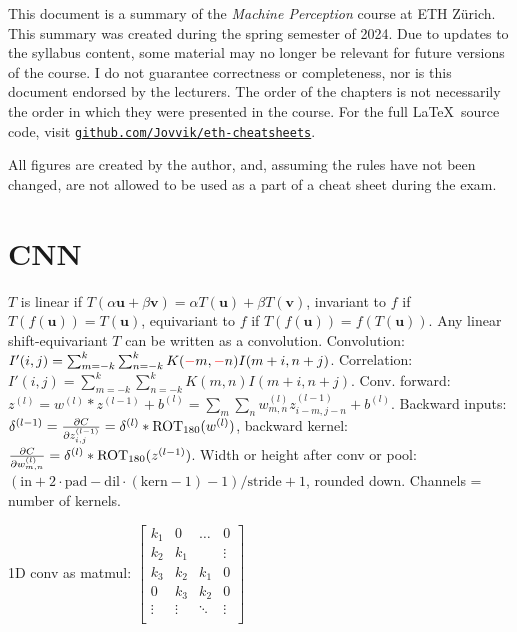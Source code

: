 \documentclass[11pt,landscape,a4paper,fleqn]{article}
\def\myvector#1{\mathbf{#1}}
\def\vu{{\myvector{u}}}
\def\vv{{\myvector{v}}}
\begin{document}
\setlength{\columnseprule}{0.1pt}
	

\begin{multicols*}{4}
\setlength{\columnseprule}{0.0pt}

This document is a summary of the \textit{Machine Perception} course at ETH Z\"urich.
This summary was created during the spring semester of 2024.
Due to updates to the syllabus content, some material may no longer be relevant for future versions of the course.
I do not guarantee correctness or completeness, nor is this document endorsed by the lecturers.
The order of the chapters is not necessarily the order in which they were presented in the course.
For the full \LaTeX \ source code, visit \texttt{\href{https://github.com/Jovvik/eth-cheatsheets}{github.com/Jovvik/eth-cheatsheets}}.

All figures are created by the author, and, assuming the rules have not been changed,
are not allowed to be used as a part of a cheat sheet during the exam.

\newpage
\setlength{\columnseprule}{0.1pt}
\section{CNN} $T$ is linear if $T(\alpha \vu + \beta \vv) = \alpha T(\vu) + \beta T(\vv)$,
invariant to $f$ if $T(f(\vu)) = T(\vu)$,
equivariant to $f$ if $T(f(\vu)) = f(T(\vu))$.
Any linear shift-equivariant $T$ can be written as a convolution.
Convolution:
$I'(i, j) = \sum_{m =- k}^k \sum_{n =- k}^k K(\textcolor{red}{-}m, \textcolor{red}{-}n)I(m + i, n + j)$.
Correlation:
$I'(i, j) = \sum_{m =- k}^k \sum_{n =- k}^k K(m, n)I(m + i, n + j)$.
Conv. forward: $z^{(l)} = w^{(l)} * z^{(l - 1)} + b^{(l)} = \sum_m \sum_n w_{m, n}^{(l)} z_{i - m, j - n}^{(l - 1)} + b^{(l)}$.
Backward inputs: $\delta^{(l - 1)} = \pdv{C}{z_{i,j}^{(l - 1)}} = \delta^{(l)} * \mathrm{ROT}_{180}(w^{(l)})$,
backward kernel: $\pdv{C}{w_{m, n}^{(l)}} = \delta^{(l)} * \mathrm{ROT}_{180}(z^{(l - 1)})$.
Width or height after conv or pool: $(\mathrm{in} + 2 \cdot \mathrm{pad} - \mathrm{dil} \cdot (\mathrm{kern} - 1) - 1) / \mathrm{stride} + 1$,
rounded down.
Channels = number of kernels.

1D conv as matmul:
\(\begin{bmatrix}
    k_1 & 0 & \dots & 0 \\
    k_2 & k_1 &  & \vdots \\
    k_3 & k_2 & k_1 & 0 \\
    0 & k_3 & k_2 & 0 \\
    \vdots & \vdots & \ddots & \vdots \\
\end{bmatrix}\)


\end{multicols*}
\end{document}
